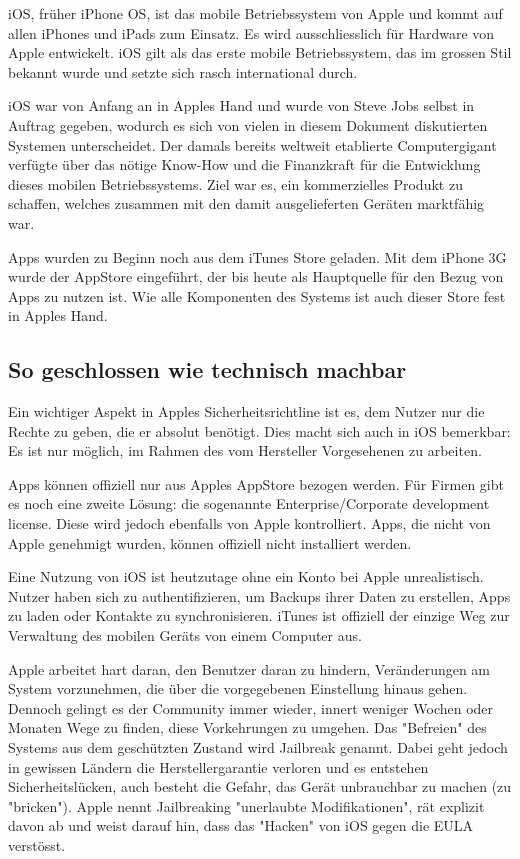 iOS, früher iPhone OS, ist das mobile Betriebssystem von Apple und kommt auf allen iPhones und iPads zum Einsatz. Es wird ausschliesslich für Hardware von Apple entwickelt. iOS gilt als das erste mobile Betriebssystem, das im grossen Stil bekannt wurde und setzte sich rasch international durch.

iOS war von Anfang an in Apples Hand und wurde von Steve Jobs selbst in Auftrag gegeben, wodurch es sich von vielen in diesem Dokument diskutierten Systemen unterscheidet. Der damals bereits weltweit etablierte Computergigant verfügte über das nötige Know-How und die Finanzkraft für die Entwicklung dieses mobilen Betriebssystems. Ziel war es, ein kommerzielles Produkt zu schaffen, welches zusammen mit den damit ausgelieferten Geräten marktfähig war.

Apps wurden zu Beginn noch aus dem iTunes Store geladen. Mit dem iPhone 3G wurde der AppStore eingeführt, der bis heute als Hauptquelle für den Bezug von Apps zu nutzen ist. Wie alle Komponenten des Systems ist auch dieser Store fest in Apples Hand.

\subsection{So geschlossen wie technisch machbar}
Ein wichtiger Aspekt in Apples Sicherheitsrichtline ist es, dem Nutzer nur die Rechte zu geben, die er absolut benötigt. Dies macht sich auch in iOS bemerkbar: Es ist nur möglich, im Rahmen des vom Hersteller Vorgesehenen zu arbeiten.

Apps können offiziell nur aus Apples AppStore bezogen werden. Für Firmen gibt es noch eine zweite Lösung: die sogenannte Enterprise/Corporate development license. Diese wird jedoch ebenfalls von Apple kontrolliert. Apps, die nicht von Apple genehmigt wurden, können offiziell nicht installiert werden.

Eine Nutzung von iOS ist heutzutage ohne ein Konto bei Apple unrealistisch. Nutzer haben sich zu authentifizieren, um Backups ihrer Daten zu erstellen, Apps zu laden oder Kontakte zu synchronisieren. iTunes ist offiziell der einzige Weg zur Verwaltung des mobilen Geräts von einem Computer aus.

Apple arbeitet hart daran, den Benutzer daran zu hindern, Veränderungen am System vorzunehmen, die über die vorgegebenen Einstellung hinaus gehen. Dennoch gelingt es der Community immer wieder, innert weniger Wochen oder Monaten Wege zu finden, diese Vorkehrungen zu umgehen. Das "Befreien" des Systems aus dem geschützten Zustand wird Jailbreak genannt. Dabei geht jedoch in gewissen Ländern die Herstellergarantie verloren und es entstehen Sicherheitslücken, auch besteht die Gefahr, das Gerät unbrauchbar zu machen (zu "bricken"). Apple nennt Jailbreaking "unerlaubte Modifikationen", rät explizit davon ab und weist darauf hin, dass das "Hacken" von iOS gegen die EULA verstösst.

